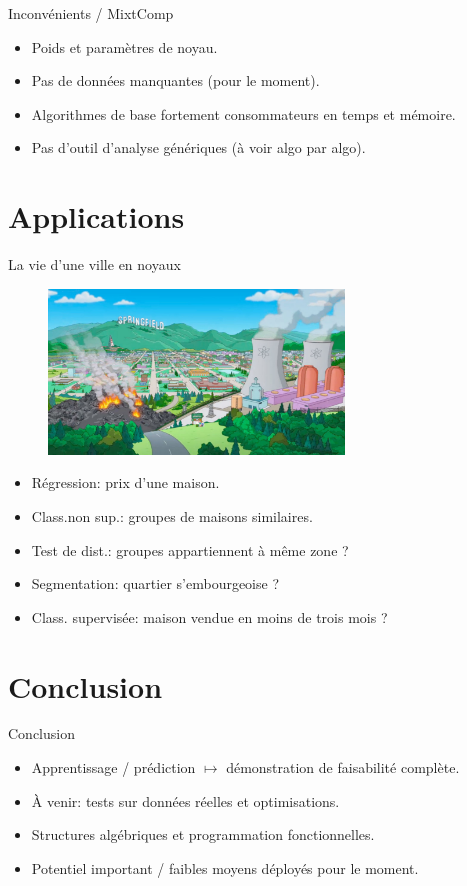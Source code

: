 \documentclass{beamer}
\begin{document}
\begin{frame}{Inconvénients / MixtComp}
	\begin{itemize}
		\item Poids et paramètres de noyau.
		\item Pas de données manquantes (pour le moment).
		\item Algorithmes de base fortement consommateurs en temps et mémoire.
		\item Pas d'outil d'analyse génériques (à voir algo par algo).
	\end{itemize}
\end{frame}

\section{Applications}

\begin{frame}{La vie d'une ville en noyaux}
	\begin{figure}[t]
	\includegraphics[width=0.7\textwidth]{figures/Springfield}
\end{figure}

	\begin{itemize}
		\item Régression: prix d'une maison.
		\item Class.non sup.: groupes de maisons similaires.
		\item Test de dist.: groupes appartiennent à même zone ?
		\item Segmentation: quartier s'embourgeoise ?
		\item Class. supervisée: maison vendue en moins de trois mois ?
	\end{itemize}
\end{frame}

\section{Conclusion}

\begin{frame}{Conclusion}
	\begin{itemize}
		\item Apprentissage / prédiction $\mapsto$ démonstration de faisabilité complète.
		\item À venir: tests sur données réelles et optimisations.
		\item Structures algébriques et programmation fonctionnelles.
		\item Potentiel important / faibles moyens déployés pour le moment.
	\end{itemize}
\end{frame}
\end{document}
